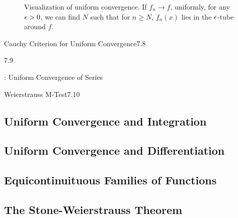 \begin{figure}[htbp]
    \centering
    
    \caption{Visualization of uniform convergence. If $f_n \rightarrow f$, uniformly, for any $\epsilon > 0$, we can find $N$ such that for $n \geq N$, $f_n(x)$ lies in the $\epsilon$-tube around $f$.}
    \label{fig40}
\end{figure}

\begin{nexample}{}{}
    
\end{nexample}

\begin{nexample}{}{}
    
\end{nexample}

\begin{theorem}{Cauchy Criterion for Uniform Convergence}{7.8}
    
\end{theorem}
\begin{nproof}
    
\end{nproof}

\begin{theorem}{}{7.9}
    
\end{theorem}
\begin{nproof}
    
\end{nproof}

\begin{ndef}{: Uniform Convergence of Series}{}
    
\end{ndef}

\begin{theorem}{Weierstrauss M-Test}{7.10}
    
\end{theorem}
\begin{nproof}
    
\end{nproof}

\subsection{Uniform Convergence and Integration}

\subsection{Uniform Convergence and Differentiation}

\subsection{Equicontinuituous Families of Functions}

\subsection{The Stone-Weierstrauss Theorem}

